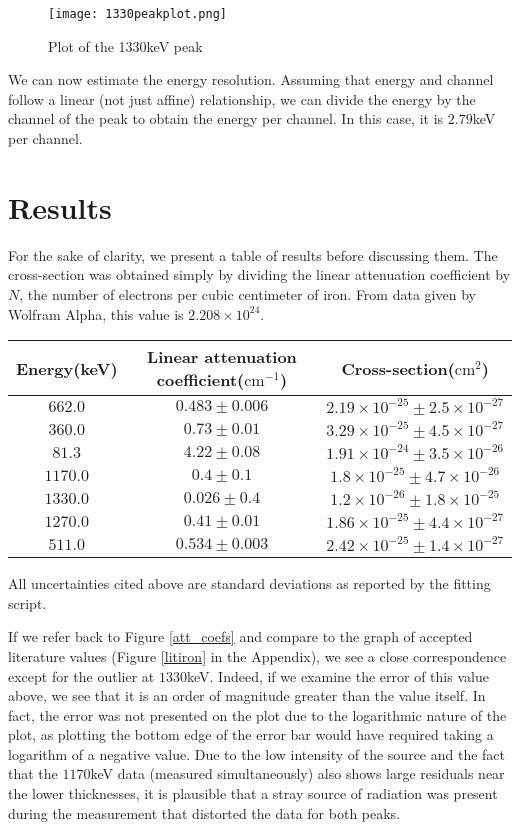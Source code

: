 \documentclass{amsart}
\begin{document}
\begin{figure}
\centering
\texttt{[image: 1330peakplot.png]}\\
\caption{Plot of the 1330keV peak}
\label{peakplot}
\end{figure}

We can now estimate the energy resolution. Assuming that energy and channel follow a linear (not just affine) relationship, we can divide the energy by the channel of the peak to obtain the energy per channel. In this case, it is $2.79$keV per channel. 
\section{Results}
For the sake of clarity, we present a table of results before discussing them. The cross-section was obtained simply by dividing the linear attenuation coefficient by $N$, the number of electrons per cubic centimeter of iron. From data given by Wolfram Alpha, this value is $2.208\times10^{24}$.

\begin{tabular}{|c|c|c|}
\hline
Energy(keV) & Linear attenuation coefficient($\text{cm}^{-1}$) & Cross-section($\text{cm}^2$)\\
\hline
$662.0$ & $0.483\pm0.006$ & $2.19\times10^{-25}\pm2.5\times10^{-27}$\\
$360.0$ & $0.73\pm0.01$ & $3.29\times10^{-25}\pm4.5\times10^{-27}$\\
$81.3$ & $4.22\pm0.08$ & $1.91\times10^{-24}\pm3.5\times10^{-26}$\\
$1170.0$ & $0.4\pm0.1$ & $1.8\times10^{-25}\pm4.7\times10^{-26}$\\
$1330.0$ & $0.026\pm0.4$ & $1.2\times10^{-26}\pm1.8\times10^{-25}$\\
$1270.0$ & $0.41\pm0.01$ & $1.86\times10^{-25}\pm4.4\times10^{-27}$\\
$511.0$ & $0.534\pm0.003$ & $2.42\times10^{-25}\pm1.4\times10^{-27}$\\
\hline
\end{tabular}

All uncertainties cited above are standard deviations as reported by the fitting script.

If we refer back to Figure \ref{att_coefs} and compare to the graph of accepted literature values (Figure \ref{litiron} in the Appendix), we see a close correspondence except for the outlier at $1330$keV. Indeed, if we examine the error of this value above, we see that it is an order of magnitude greater than the value itself. In fact, the error was not presented on the plot due to the logarithmic nature of the plot, as plotting the bottom edge of the error bar would have required taking a logarithm of a negative value. Due to the low intensity of the source and the fact that the $1170$keV data (measured simultaneously) also shows large residuals near the lower thicknesses, it is plausible that a stray source of radiation was present during the measurement that distorted the data for both peaks. 
\end{document}
